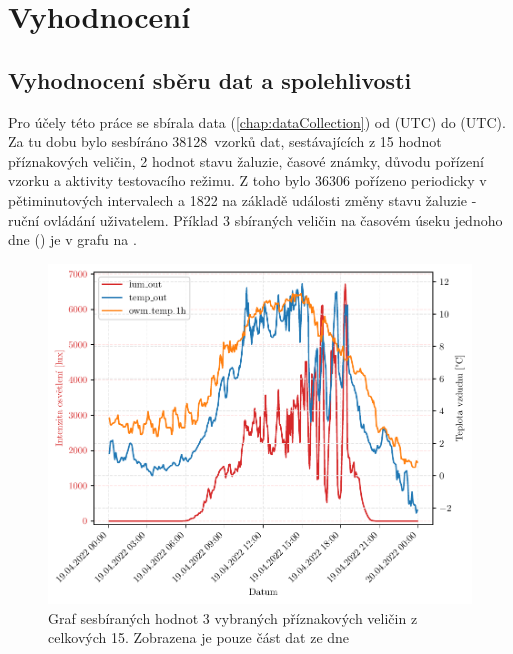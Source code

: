 \chapter{Vyhodnocení}
\section{Vyhodnocení sběru dat a spolehlivosti} \label{sec:resData}
    Pro účely této práce se sbírala data (\cref{chap:dataCollection}) od   (UTC) do   (UTC). Za tu dobu bylo sesbíráno 38128~vzor\-ků dat, sestávajících z 15 hodnot příznakových veličin, 2 hodnot stavu žaluzie, časové známky, důvodu pořízení vzorku a aktivity testovacího režimu. Z toho bylo 36306 pořízeno periodicky v pětiminutových intervalech a 1822 na základě události změny stavu žaluzie - ruční ovládání uživatelem. Příklad 3 sbíraných veličin na časovém úseku jednoho dne () je v grafu na .
    \begin{figure}[H]
        \centering
        \includegraphics[draft=false,width=\textwidth]{img/results/data_sel.pdf}
        \caption[Graf sesbíraných dat (příklad)]{Graf sesbíraných hodnot 3 vybraných příznakových veličin z celkových 15. Zobrazena je pouze část dat ze dne }
        \label{fig:data_sel}
    \end{figure}

